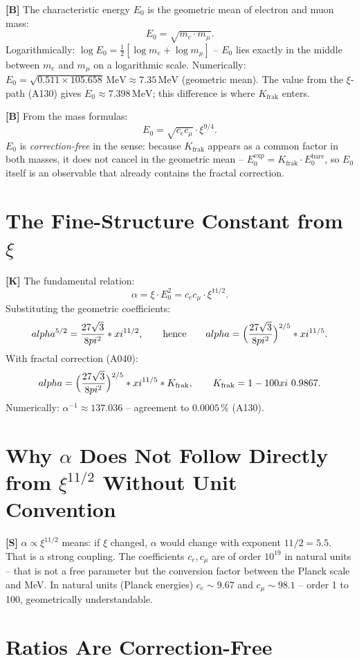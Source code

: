 \textbf{[B]} The characteristic energy $E_0$ is the geometric mean of electron
and muon mass:
\[
  \boxed{E_0 = \sqrt{m_e\cdot m_\mu}}.
\]
Logarithmically: $\log E_0 = \tfrac12[\log m_e+\log m_\mu]$ -- $E_0$ lies exactly
in the middle between $m_e$ and $m_\mu$ on a logarithmic scale. Numerically:
$E_0 = \sqrt{0{.}511\times105{.}658}\,\text{MeV}\approx7{.}35\,\text{MeV}$
(geometric mean). The value from the $\xi$-path (A130) gives $E_0\approx7{.}398\,\text{MeV}$;
this difference is where $K_\text{frak}$ enters.

\textbf{[B]} From the mass formulas:
\[
  E_0 = \sqrt{c_ec_\mu}\cdot\xi^{9/4}.
\]
$E_0$ is \emph{correction-free} in the sense: because $K_\text{frak}$ appears as
a common factor in both masses, it does not cancel in the geometric mean --
$E_0^\text{exp}=K_\text{frak}\cdot E_0^\text{bare}$, so $E_0$ itself is an
observable that already contains the fractal correction.

\section{The Fine-Structure Constant from $\xi$}

\textbf{[K]} The fundamental relation:
\[
  \alpha = \xi\cdot E_0^2 = c_ec_\mu\cdot\xi^{11/2}.
\]
Substituting the geometric coefficients:
\[
  \alpha^{5/2} = \frac{27\sqrt3}{8\pi^2}\cdot\xi^{11/2},
  \qquad\text{hence}\qquad
  \alpha = \Bigl(\frac{27\sqrt3}{8\pi^2}\Bigr)^{2/5}\cdot\xi^{11/5}.
\]
With fractal correction (A040):
\[
  \alpha = \Bigl(\frac{27\sqrt3}{8\pi^2}\Bigr)^{2/5}\cdot\xi^{11/5}\cdot K_\text{frak},
  \qquad K_\text{frak}=1-100\xi\approx0{.}9867.
\]
Numerically: $\alpha^{-1}\approx137{.}036$ -- agreement to $0{.}0005\,\%$ (A130).

\section{Why $\alpha$ Does Not Follow Directly from $\xi^{11/2}$ Without Unit Convention}

\textbf{[S]} $\alpha\propto\xi^{11/2}$ means: if $\xi$ changed, $\alpha$ would
change with exponent $11/2=5{.}5$. That is a strong coupling. The coefficients
$c_e,c_\mu$ are of order $10^{19}$ in natural units -- that is not a free
parameter but the conversion factor between the Planck scale and MeV. In natural
units (Planck energies) $c_e\sim9{.}67$ and $c_\mu\sim98{.}1$ -- order 1 to 100,
geometrically understandable.

\section{Ratios Are Correction-Free}

